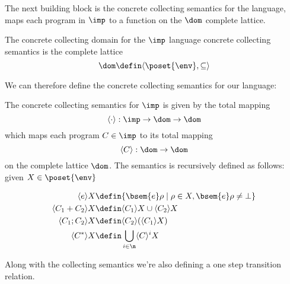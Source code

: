 The next building block is the concrete collecting semantics for the
language, maps each program in \(\imp\) to a function on the \(\dom\)
complete lattice.

\begin{definition}
  The concrete collecting domain for the \(\imp\) language concrete
  collecting semantics is the complete lattice \[\dom \defin \langle
  \poset{\env} , \subseteq \rangle \]
\end{definition}

We can therefore define the concrete collecting semantics for our
language:

\begin{definition}
  The concrete collecting semantics for \(\imp\) is given by the total
  mapping \[\langle \cdot \rangle : \imp \to \dom \to \dom\] which
  maps each program \(C \in \imp\) to its total mapping \[\langle C
  \rangle : \dom \to \dom\] on the complete lattice \(\dom\). The
  semantics is recursively defined as follows: given \(X \in \poset{\env}\)

  \begin{align*}
    \langle e \rangle X & \defin \{\bsem{ e} \rho \mid \rho \in X,
    \bsem{ e} \rho \neq \bot\} \\
    \langle C_1 + C_2 \rangle X & \defin \langle C_1 \rangle X \cup
    \langle C_2 \rangle X \\
    \langle C_1 ; C_2 \rangle X & \defin \langle C_2 \rangle (\langle
    C_1 \rangle X) \\
    \langle C^* \rangle X & \defin \bigcup_{i \in \n} \langle C \rangle^i X
  \end{align*}
\end{definition}


Along with the collecting semantics we're also defining a one step
transition relation.


